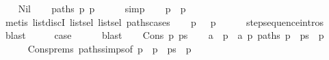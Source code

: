 \begin{isabellebody}
\ \ \isamarkupfalse%
\ Nil\isanewline
\ \ \isamarkupfalse%
\ {\isacartoucheopen}paths\ {\isacharbrackleft}{\kern0pt}p{\isacharcomma}{\kern0pt}\ p{\isacharprime}{\kern0pt}{\isacharprime}{\kern0pt}{\isacharbrackright}{\kern0pt}{\isacartoucheclose}\isanewline
\ \ \ \ \isamarkupfalse%
\ simp\isanewline
\ \ \isamarkupfalse%
\ {\isacartoucheopen}p\ {\isacharequal}{\kern0pt}\ p{\isacharprime}{\kern0pt}{\isacharprime}{\kern0pt}{\isacartoucheclose}\isanewline
\ \ \ \ \isamarkupfalse%
\ {\isacharparenleft}{\kern0pt}metis\ list{\isachardot}{\kern0pt}discI\ list{\isachardot}{\kern0pt}sel{\isacharparenleft}{\kern0pt}{}{\isacharparenright}{\kern0pt}\ list{\isachardot}{\kern0pt}sel{\isacharparenleft}{\kern0pt}{}{\isacharparenright}{\kern0pt}\ paths{\isachardot}{\kern0pt}cases{\isacharparenright}{\kern0pt}\isanewline
\ \ \isamarkupfalse%
\ {\isacartoucheopen}p\ {\isasymmapsto}{\isachardollar}{\kern0pt}\ {\isacharbrackleft}{\kern0pt}{\isacharbrackright}{\kern0pt}\ p{\isacharprime}{\kern0pt}{\isacharprime}{\kern0pt}{\isacartoucheclose}\isanewline
\ \ \ \ \isamarkupfalse%
\ step{\isacharunderscore}{\kern0pt}sequence{\isachardot}{\kern0pt}intros{\isacharparenleft}{\kern0pt}{}{\isacharparenright}{\kern0pt}\ \isamarkupfalse%
\ blast\isanewline
\ \ \isamarkupfalse%
\ \isamarkupfalse%
\ {\isacharquery}{\kern0pt}case\isanewline
\ \ \ \ \isamarkupfalse%
\ blast\isanewline
{}\isamarkupfalse%
\isanewline
\ \ \isamarkupfalse%
\ {\isacharparenleft}{\kern0pt}Cons\ p{\isacharprime}{\kern0pt}\ ps{\isacharparenright}{\kern0pt}\isanewline
\ \ \isamarkupfalse%
\ a\ \ {\isacartoucheopen}p\ {\isasymmapsto}\ a\ p{\isacharprime}{\kern0pt}{\isacartoucheclose}\ {\isacartoucheopen}paths\ {\isacharparenleft}{\kern0pt}p{\isacharprime}{\kern0pt}\ {\isacharhash}{\kern0pt}\ ps\ {\isacharat}{\kern0pt}\ {\isacharbrackleft}{\kern0pt}p{\isacharprime}{\kern0pt}{\isacharprime}{\kern0pt}{\isacharbrackright}{\kern0pt}{\isacharparenright}{\kern0pt}{\isacartoucheclose}\isanewline
\ \ \ \ \isamarkupfalse%
\ Cons{\isachardot}{\kern0pt}prems\ paths{\isachardot}{\kern0pt}simps{\isacharbrackleft}{\kern0pt}of\ {\isacartoucheopen}p\ {\isacharhash}{\kern0pt}\ {\isacharparenleft}{\kern0pt}p{\isacharprime}{\kern0pt}\ {\isacharhash}{\kern0pt}\ ps{\isacharparenright}{\kern0pt}\ {\isacharat}{\kern0pt}\ {\isacharbrackleft}{\kern0pt}p{\isacharprime}{\kern0pt}{\isacharprime}{\kern0pt}{\isacharbrackright}{\kern0pt}{\isacartoucheclose}{\isacharbrackright}{\kern0pt}\isanewline

\end{isabellebody}
